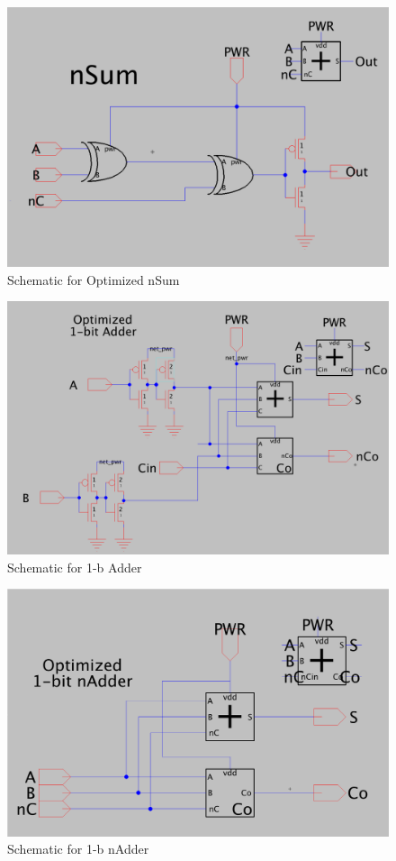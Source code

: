 \documentclass{article}
\begin{document}
\begin{figure}[H]
  \includegraphics[width=\linewidth]{opt_screenshots/opt_nsum_sch.png}
  \caption{Schematic for Optimized nSum}
  \label{fig:opt_nsum_sch}
\end{figure}

\begin{figure}[H]
  \includegraphics[width=\linewidth]{opt_screenshots/opt_1b_adder_sch.png}
  \caption{Schematic for 1-b Adder}
  \label{fig:opt_1b_adder_sch}
\end{figure}

\begin{figure}[H]
  \includegraphics[width=\linewidth]{opt_screenshots/opt_1b_nadder_sch.png}
  \caption{Schematic for 1-b nAdder}
  \label{fig:opt_1b_nadder_sch}
\end{figure}
\end{document}
